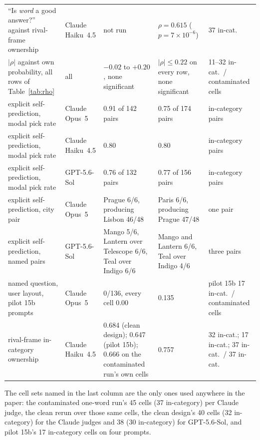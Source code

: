 \documentclass[twocolumn,10pt]{article}
\newcommand{\opus}{Claude Opus~5}
\newcommand{\haiku}{Claude Haiku~4.5}
\newcommand{\gpt}{GPT-5.6-Sol}
\begin{document}
\begin{table}[t]
\begin{tabular}{p{3.5cm}lp{2.95cm}p{2.95cm}p{2.65cm}}
``Is \textit{word} a good answer?'' against rival-frame ownership & \haiku{} & not run & $\rho = 0.615$ ($p=7\times10^{-6}$) & 37 in-cat. \\
$|\rho|$ against own probability, all rows of Table~\ref{tab:rho} & all & $-0.02$ to $+0.20$, none significant & $|\rho| \le 0.22$ on every row, none significant & 11--32 in-cat.\ / contaminated cells \\
explicit self-prediction, modal pick rate & \opus{} & 0.91 of 142 pairs & 0.75 of 174 pairs & in-category pairs \\
explicit self-prediction, modal pick rate & \haiku{} & 0.80 & 0.80 & in-category pairs \\
explicit self-prediction, modal pick rate & \gpt{} & 0.76 of 132 pairs & 0.77 of 156 pairs & in-category pairs \\
explicit self-prediction, city pair & \opus{} & Prague 6/6, producing Lisbon 46/48 & Paris 6/6, producing Prague 47/48 & one pair \\
explicit self-prediction, named pairs & \gpt{} & Mango 5/6, Lantern over Telescope 6/6, Teal over Indigo 6/6 & Mango and Lantern 6/6, Teal over Indigo 4/6 & three pairs \\
named question, user layout, pilot 15b prompts & \opus{} & 0/136, every cell 0.00 & 0.135 & pilot 15b 17 in-cat.\ / contaminated cells \\
rival-frame in-category ownership & \haiku{} & 0.684 (clean design); 0.647 (pilot 15b); 0.666 on the contaminated run's own cells & 0.757 & 32 in-cat.; 17 in-cat.; 37 in-cat.\ / 37 in-cat. \\
\bottomrule
\end{tabular}
\end{table}

The cell sets named in the last column are the only ones used anywhere in the paper: the contaminated one-word run's 45 cells (37 in-category) per Claude judge, the clean rerun over those same cells, the clean design's 40 cells (32 in-category) for the Claude judges and 38 (30 in-category) for \gpt{}, and pilot 15b's 17 in-category cells on four prompts.
\end{document}
